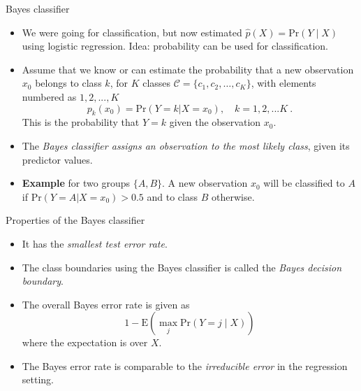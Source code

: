 \documentclass[10pt,ignorenonframetext,]{beamer}
\providecommand{\tightlist}{%
  \setlength{\itemsep}{0pt}\setlength{\parskip}{0pt}}
\begin{document}
\begin{frame}

\begin{block}{Bayes classifier}

\begin{itemize}
\tightlist
\item
  We were going for classification, but now estimated
  \(\hat{p}(X)=\text{Pr}(Y \mid X)\) using logistic regression. Idea:
  probability can be used for classification.
\end{itemize}

\vspace{1mm}

\begin{itemize}
\item
  Assume that we know or can estimate the probability that a new
  observation \(x_0\) belongs to class \(k\), for \(K\) classes
  \(\mathcal{C} = \{c_1, c_2,\ldots, c_K\}\), with elements numbered as
  \(1, 2, ..., K\)
  \[p_k(x_0) = \text{Pr}(Y=k | X=x_0), \quad k = 1, 2, ... K \ .\] This
  is the probability that \(Y=k\) given the observation \(x_0\).
  \vspace{1mm}
\item
  The \emph{Bayes classifier assigns an observation to the most likely
  class}, given its predictor values.
\end{itemize}

\vspace{1mm}

\begin{itemize}
\tightlist
\item
  \textbf{Example} for two groups \(\{A, B\}\). A new observation
  \(x_0\) will be classified to \(A\) if
  \(\text{Pr}(Y=A | X=x_0) > 0.5\) and to class \(B\) otherwise.
\end{itemize}

\end{block}

\end{frame}

\begin{frame}

\begin{block}{Properties of the Bayes classifier}

\begin{itemize}
\item
  It has the \emph{smallest test error rate}.
\item
  The class boundaries using the Bayes classifier is called the
  \emph{Bayes decision boundary}.
\item
  The overall Bayes error rate is given as
  \[1-\text{E}(\max_j \text{Pr}(Y=j\mid X))\] where the expectation is
  over \(X\).
\item
  The Bayes error rate is comparable to the \emph{irreducible error} in
  the regression setting.
\end{itemize}

\end{block}

\end{frame}
\end{document}
